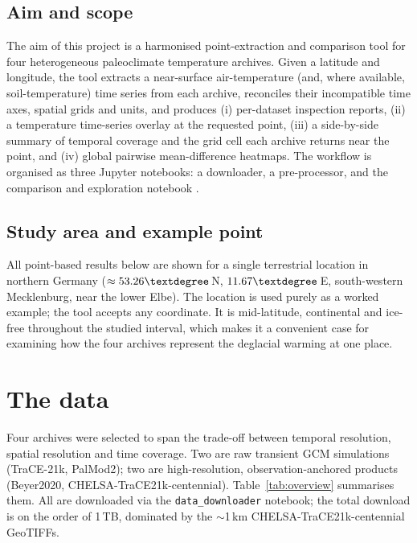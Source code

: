 \documentclass{isprs} %
\newcommand{\dg}{\textdegree}
\newcommand{\tabbr}[1]{\texttt{#1}}
\begin{document}
\subsection{Aim and scope}
The aim of this project is a harmonised point-extraction and comparison tool for four heterogeneous paleoclimate temperature archives. Given a latitude and longitude, the tool extracts a near-surface air-temperature (and, where available, soil-temperature) time series from each archive, reconciles their incompatible time axes, spatial grids and units, and produces (i) per-dataset inspection reports, (ii) a temperature time-series overlay at the requested point, (iii) a side-by-side summary of temporal coverage and the grid cell each archive returns near the point, and (iv) global pairwise mean-difference heatmaps. The workflow is organised as three Jupyter notebooks: a downloader, a pre-processor, and the comparison and exploration notebook \cite{giersch2026_paleoclimate_model_comparison}.

\subsection{Study area and example point}
All point-based results below are shown for a single terrestrial location in northern Germany ($\approx 53.26\dg$\,N, $11.67\dg$\,E, south-western Mecklenburg, near the lower Elbe). The location is used purely as a worked example; the tool accepts any coordinate. It is mid-latitude, continental and ice-free throughout the studied interval, which makes it a convenient case for examining how the four archives represent the deglacial warming at one place.

\section{The data}
Four archives were selected to span the trade-off between temporal resolution, spatial resolution and time coverage. Two are raw transient GCM simulations (TraCE-21k, PalMod2); two are high-resolution, observation-anchored products (Beyer2020, CHELSA-TraCE21k-centennial). Table~\ref{tab:overview} summarises them. All are downloaded via the \tabbr{data\_downloader} notebook; the total download is on the order of 1\,TB, dominated by the $\sim$1\,km CHELSA-TraCE21k-centennial GeoTIFFs.
\end{document}
